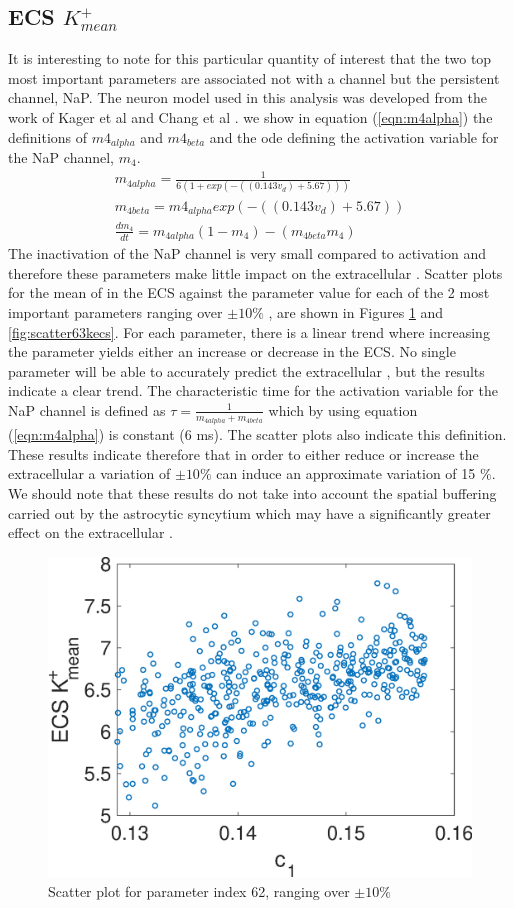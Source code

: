\subsection{ECS $K^+_{mean}$}
It is interesting to note for this particular quantity of interest that the two top most important parameters are associated not with a \pot channel but the persistent \na channel, NaP.  The neuron model used in this analysis was developed from the work of Kager et al \cite{Kager2000a} and Chang et al \cite{Chang2013}. we show in equation (\ref{eqn:m4alpha}) the definitions of $m4_{alpha}$ and $m4_{beta}$ and the ode defining the activation variable for the NaP channel, $m_4$.
\begin{eqnarray}\label{eqn:m4alpha}
m_{4 alpha}= \frac{1}{6(1 + exp(-((0.143 v_d) + 5.67)))} \nonumber \\
m_{4 beta} = m4_{alpha} exp(-((0.143 v_d) + 5.67)) \nonumber \\
\frac{d m_4}{dt} = m_{4 alpha}(1 - m_4) - (m_{4beta} m_4)
\end{eqnarray}
The inactivation of the NaP channel is very small compared to activation and therefore these parameters make little impact on the extracellular \pot. 
Scatter plots for the mean of \pot in the  ECS against the parameter value for each of the 2 most important parameters ranging over $\pm 10\%$ , are shown in Figures \ref{fig:scatter62kecs} and  \ref{fig:scatter63kecs}. For each parameter, there is a linear trend where increasing the parameter yields either an increase or decrease in the \pot ECS. No single parameter will be able to accurately predict the extracellular \pot, but the results indicate a clear trend. The characteristic time for the activation variable for the NaP channel is defined as $\tau=\frac{1}{m_{4 alpha}+m_{4 beta}}$ which by using equation (\ref{eqn:m4alpha}) is constant (6 ms). The scatter plots also indicate this definition. These results indicate therefore that in order to either reduce or increase the extracellular \pot a variation of $\pm 10 \%$ can induce an approximate variation of 15 $\%$. We should note that these results do not take into account the spatial buffering carried out by the astrocytic syncytium which may have a significantly greater effect on the extracellular \pot. 
\begin{figure}
\centering
\includegraphics[width=0.7\linewidth]{Figures/Scatter_62_K_ECS}
\caption{Scatter plot for parameter index 62, ranging over  $\pm 10\%$ }
\label{fig:scatter62kecs}
\end{figure}
